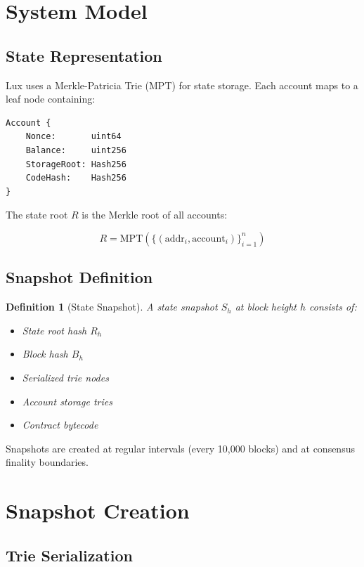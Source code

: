 \documentclass[11pt,a4paper]{article}
\newtheorem{definition}{Definition}
\begin{document}
\section{System Model}

\subsection{State Representation}

Lux uses a Merkle-Patricia Trie (MPT) for state storage. Each account maps to a leaf node containing:

\begin{lstlisting}
Account {
    Nonce:       uint64
    Balance:     uint256
    StorageRoot: Hash256
    CodeHash:    Hash256
}
\end{lstlisting}

The state root $R$ is the Merkle root of all accounts:

\[
R = \text{MPT}(\{(\text{addr}_i, \text{account}_i)\}_{i=1}^{n})
\]

\subsection{Snapshot Definition}

\begin{definition}[State Snapshot]
A state snapshot $S_h$ at block height $h$ consists of:
\begin{itemize}
    \item State root hash $R_h$
    \item Block hash $B_h$
    \item Serialized trie nodes
    \item Account storage tries
    \item Contract bytecode
\end{itemize}
\end{definition}

Snapshots are created at regular intervals (every 10,000 blocks) and at consensus finality boundaries.

\section{Snapshot Creation}

\subsection{Trie Serialization}
\end{document}
